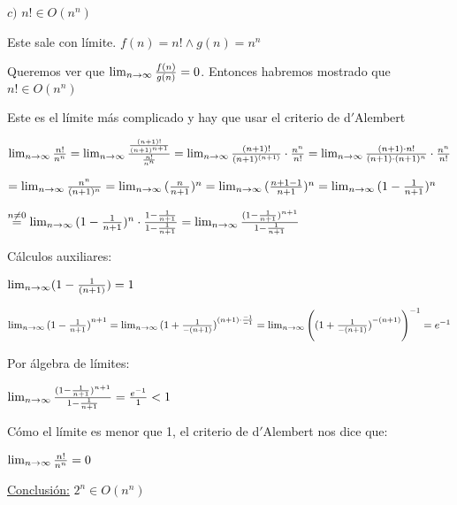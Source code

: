 \documentclass[10pt,a4paper]{article}
\begin{document}
\demoline
\demoline
\par $c)$ \ensuremath{n! \in O(n^n)}
\demoline
\begin{groupIzq}{2.5em}
  \par Este sale con límite. \ensuremath{f(n) = n! \land g(n) = n^n}
  \par Queremos ver que \ensuremath{\limn \frac{f(n)}{g(n)} = 0}. Entonces habremos mostrado que \ensuremath{n! \in O(n^n)}
  \par Este es el límite más complicado y hay que usar el criterio de d$'$Alembert
  \par \ensuremath{\limn \frac{n!}{n^n} = \limn\frac{\frac{(n+1)!}{(n+1)^{n+1}}}{\frac{n!}{n^n}} = \limn\frac{(n+1)!}{(n+1)^{(n+1)}} \cdot \frac{n^n}{n!} = \limn\frac{(n+1) \cdot n!}{(n+1) \cdot (n+1)^{n}} \cdot \frac{n^n}{n!}}
  \par \hspace{4.85em} \ensuremath{= \limn\frac{n^n}{(n+1)^n} = \limn{(\frac{n}{n+1})^n} = \limn{(\frac{n+1-1}{n+1})^n} = \limn{(1 - \frac{1}{n+1})^n}}
  \par \hspace{4.85em} \ensuremath{\overset{n \neq 0}{=} \limn{(1 - \frac{1}{n+1})^n} \cdot \frac{1 - \frac{1}{n+1}}{1 - \frac{1}{n+1}} =
  \limn\frac{(1 - \frac{1}{n+1})^{n+1}}{1 - \frac{1}{n+1}}}
  \par Cálculos auxiliares:
  \par \ensuremath{\limn (1 - \frac{1}{(n+1)}) = 1}
  \par \ensuremath{\limn {(1 - \frac{1}{n+1})}^{n+1} = \limn{(1 + \frac{1}{-(n+1)})}^{(n+1) \cdot \frac{-1}{-1}} = \limn\Bigg({{(1 + \frac{1}{-(n+1)})}^{-(n+1)}}\Bigg)^{-1} = e^{-1}}
  \par Por álgebra de límites:
  \par \ensuremath{\limn\frac{(1 - \frac{1}{n+1})^{n+1}}{1 - \frac{1}{n+1}} = \frac{e^{-1}}{1} < 1}
  \par Cómo el límite es menor que 1, el criterio de d$'$Alembert nos dice que:
  \par \ensuremath{\limn \frac{n!}{n^n} = 0}
  \par \underline{Conclusión:} \ensuremath{2^n \in O(n^n)}
\end{groupIzq}
\end{document}
